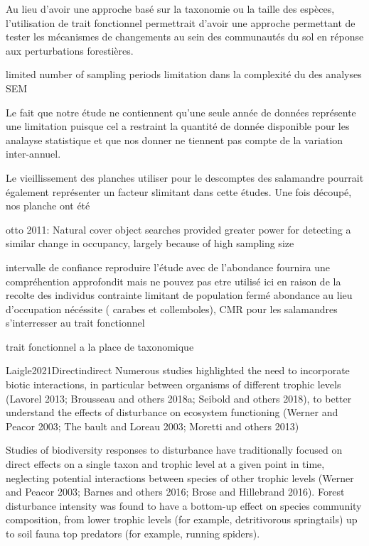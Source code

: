 Au lieu d'avoir une approche basé sur la taxonomie ou la taille des espèces, l'utilisation de trait fonctionnel permettrait d'avoir une approche permettant 
de tester les mécanismes de changements au sein des communautés du sol en réponse aux perturbations forestières.



limited number of sampling periods
limitation dans la complexité du des analyses SEM

Le fait que notre étude ne contiennent qu'une seule année de données représente une limitation puisque cel a restraint la quantité de donnée disponible pour les analayse statistique  et que 
nos donner ne tiennent pas compte de la variation inter-annuel. 

Le vieillissement des planches utiliser pour le descomptes des salamandre pourrait également représenter un facteur slimitant dans cette études. Une fois découpé, nos planche ont été 

  otto 2011:
  Natural cover object searches provided greater power for detecting a similar change in occupancy, largely because of high sampling size

    intervalle de confiance
  reproduire l'étude avec de l'abondance fournira une compréhention approfondit mais ne pouvez pas etre utilisé ici en raison de la recolte des individus
  contrainte limitant de population fermé
  abondance au lieu d'occupation nécéssite ( carabes et collemboles), CMR pour les salamandres
  s'interresser au trait fonctionnel 

  trait fonctionnel a la place de taxonomique



Laigle2021Directindirect
Numerous studies highlighted the need to incorporate biotic interactions, in particular between organisms of different trophic levels (Lavorel 2013; Brousseau and others 2018a; Seibold and others 2018), to better understand the effects of disturbance on ecosystem functioning (Werner and Peacor 2003; The bault and Loreau 2003; Moretti and others 2013)

Studies of biodiversity responses to disturbance have traditionally focused on direct effects on a single taxon and trophic level at a given point in time, neglecting potential interactions between species of other trophic levels (Werner and Peacor 2003; Barnes and others 2016; Brose and Hillebrand 2016).
Forest disturbance intensity was found to have a bottom-up effect on species community composition, from lower trophic levels (for example, detritivorous springtails) up to soil fauna top predators (for example, running spiders).


